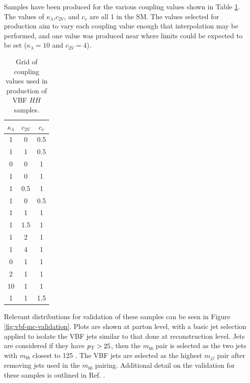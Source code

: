 Samples have been produced for the various coupling values shown in Table \ref{tab:vbf-coupling-samples}. The values of $\kappa_\lambda$,$c_{2V}$, and $c_{v}$ are all 1 in the SM. The values selected for production aim to vary each coupling value enough that interpolation may be performed, and one value was produced near where limits could be expected to be set ($\kappa_\lambda = 10$ and $c_{2V}=4$).

\begin{table}[htbp]
    \centering
    \begin{tabular}{c|c|c}
        $\kappa_\lambda$ & $c_{2V}$ & $c_{v}$ \\
        \hline
        1 & 0 & 0.5 \\
        1 & 1 & 0.5 \\
        0 & 0 & 1 \\
        1 & 0 & 1 \\
        1 & 0.5 & 1 \\
        1 & 0 & 0.5 \\
        1 & 1 & 1 \\
        1 & 1.5 & 1 \\
        1 & 2 & 1 \\
        1 & 4 & 1 \\
        0 & 1 & 1 \\
        2 & 1 & 1 \\
        10 & 1 & 1 \\
        1 & 1 & 1.5
    \end{tabular}
    \caption{Grid of coupling values used in production of VBF $HH$ samples.}
    \label{tab:vbf-coupling-samples}
\end{table}

Relevant distributions for validation of these samples can be seen in Figure \ref{fig:vbf-mc-validation}. Plots are shown at parton level, with a basic jet selection applied to isolate the VBF jets similar to that done at reconstruction level. Jets are considered if they have $p_{\text{T}} > 25$, then the $m_{bb}$ pair is selected as the two jets with $m_{bb}$ closest to 125 \GeV. The VBF jets are selected as the highest $m_{jj}$ pair after removing jets used in the $m_{bb}$ pairing. Additional detail on the validation for these samples is outlined in Ref. \cite{mc-validation}.

